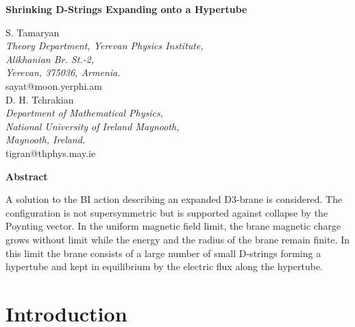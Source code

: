 \documentclass[a4paper,12pt]{article}
\begin{document}
\setlength{\textheight}{9.0in}
\setlength{\topmargin}{-0.6in}
\setlength{\oddsidemargin}{0.15in}
\setlength{\evensidemargin}{0.4in}
\renewcommand{\thefootnote}{\fnsymbol{footnote}}
\newcommand{\e}{{\bf E}}
\newcommand{\m}{{\bf B}}
\newcommand{\h}{{\bf H}}
\renewcommand{\d}{{\bf D}}

\vspace{1cm}

\begin{center}
{\Large {\bf Shrinking D-Strings Expanding onto a Hypertube}}
\vspace{1truecm}

{\large S. Tamaryan}\\
\smallskip
{\it  Theory Department, Yerevan Physics Institute,\\ 
Alikhanian Br. St.-2,\\
Yerevan, 375036, Armenia.}\\
\smallskip
sayat@moon.yerphi.am\\
\vspace{1truecm}
{\large D. H. Tchrakian}\\
\smallskip
{\it Department of Mathematical Physics,\\
National University of Ireland Maynooth,\\
Maynooth, Ireland.}\\
\smallskip
tigran@thphys.may.ie

\end{center}

\vspace{1cm}

{\centerline {\bf Abstract}}

\vspace{0.4cm}

A solution to the BI action describing an expanded D3-brane is considered. The configuration is not supersymmetric but is supported against collapse by the Poynting vector. In the uniform magnetic field limit, the brane magnetic charge grows without limit while the energy and the radius of the brane remain finite. In this limit the brane consists of a large number of small D-strings forming a hypertube and kept in equilibrium by the electric flux along the hypertube.


\newpage
\section{Introduction}
\end{document}
